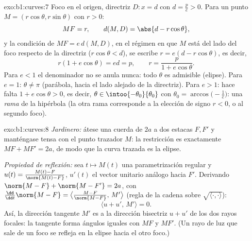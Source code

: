 \begin{solution}{exo:b1:curves:7}
Foco en el origen, directriz $D: x = d$ con $d = \frac pe > 0$.
Para un punto $M = (r\cos\theta, r\sin\theta)$ con $r > 0$:
\[
MF = r,
\qquad
d(M, D) = \abs{d - r\cos\theta},
\]
y la condición de  $MF = e\,d(M, D)$, en el régimen en que $M$
está del lado del foco respecto de la directriz ($r\cos\theta < d$), se escribe $r
= e(d - r\cos\theta)$, es decir,
\[
r(1 + e\cos\theta) = ed = p,
\qquad
r = \frac{p}{1 + e\cos\theta} .
\]
Para $e < 1$ el denominador no se anula nunca: todo $\theta$ es admisible
(elipse). Para $e = 1$: $\theta \neq \pi$ (parábola,  hacia
el lado alejado de la directriz). Para $e > 1$: hace falta $1 + e\cos\theta > 0$,
es decir, $\theta \in \intoo{-\theta_0}{\theta_0}$ con $\theta_0 =
\arccos\bigl(-\frac1e\bigr)$: una \emph{rama} de la hipérbola
(la otra rama corresponde a la elección de signo $r < 0$, o al
segundo foco).
\end{solution}

\begin{solution}{exo:b1:curves:8}
\emph{Jardinero:} átese una cuerda de  $2a$ a dos estacas $F,
F'$ y manténgase tensa con el punto trazador $M$: la restricción es
exactamente $MF + MF' = 2a$, de modo que la curva trazada es la elipse.

\emph{Propiedad de reflexión:} sea $t \mapsto M(t)$ una
parametrización regular y $u(t) = \frac{M(t) - F}{\norm{M(t) - F}}$,
$u'(t)$ el vector unitario análogo hacia $F'$. Derivando
$\norm{M - F} + \norm{M - F'} = 2a$, con $\frac{\dd}{\dd
t}\norm{M - F} = \bigl\langle \frac{M - F}{\norm{M-F}},\,
M'\bigr\rangle$ (regla de la cadena sobre $\sqrt{\langle\cdot,\cdot\rangle}$):
\[
\bigl\langle u + u',\, M'\bigr\rangle = 0 .
\]
Así, la dirección tangente $M'$ es  a la dirección
bisectriz $u + u'$ de los dos rayos focales: la tangente forma ángulos
iguales con $MF$ y $MF'$. (Un rayo de luz que sale de un foco se refleja
en la elipse hacia el otro foco.)
\end{solution}

